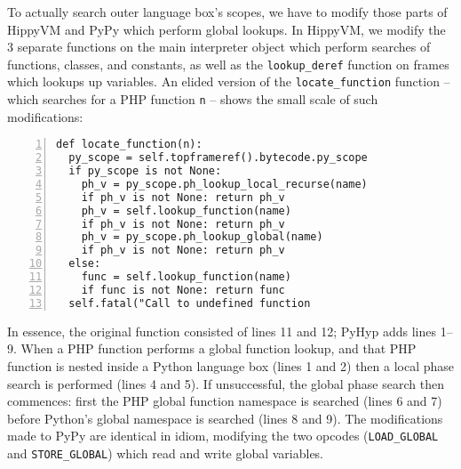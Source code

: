 \documentclass[a4paper,UKenglish]{lipics-v2016}
\newcommand{\ourvm}{PyHyp\xspace}
\newcommand{\hippy}{HippyVM\xspace}
\newcommand{\pypy}{PyPy\xspace}
\begin{document}
{{{To actually search outer language box's scopes, we have to modify those parts
of \hippy and \pypy which perform global lookups. In \hippy, we modify the
3 separate functions on the main interpreter object which perform searches of
functions, classes, and constants, as well as the \texttt{lookup\_deref}
function on frames which lookups up variables. An elided version of the
\texttt{locate\_function} function -- which searches for a PHP function
\texttt{n} -- shows the small scale of such modifications:
\begin{lstlisting}[numbers=left]
def locate_function(n):
  py_scope = self.topframeref().bytecode.py_scope
  if py_scope is not None:
    ph_v = py_scope.ph_lookup_local_recurse(name)
    if ph_v is not None: return ph_v
    ph_v = self.lookup_function(name)
    if ph_v is not None: return ph_v
    ph_v = py_scope.ph_lookup_global(name)
    if ph_v is not None: return ph_v
  else:
    func = self.lookup_function(name)
    if func is not None: return func
  self.fatal("Call to undefined function \end{lstlisting}
In essence, the original function consisted of lines 11 and 12; \ourvm adds
lines 1--9. When a PHP function performs a global function lookup, and
that PHP function is nested inside a Python language box (lines 1 and 2)
then a local phase search is performed (lines 4 and 5). If unsuccessful, the global
phase search then commences: first the PHP global function namespace is searched
(lines 6 and 7) before Python's global namespace is searched (lines 8 and 9).
The modifications made to \pypy are identical in idiom, modifying
the two opcodes (\texttt{LOAD\_GLOBAL} and
\texttt{STORE\_GLOBAL}) which read and write global variables.

}}}
\end{document}
